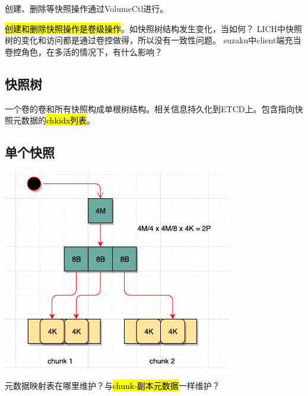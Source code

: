 创建、删除等快照操作通过VolumeCtl进行。

\hl{创建和删除快照操作是卷级操作}。如快照树结构发生变化，当如何？
LICH中快照树的变化和访问都是通过卷控做得，所以没有一致性问题。
suzaku中client端充当卷控角色，在多活的情况下，有什么影响？


\subsection{快照树}

一个卷的卷和所有快照构成单根树结构。相关信息持久化到ETCD上。包含指向快照元数据的\hl{chkidx列表}。



\subsection{单个快照}

\begin{center}
\includegraphics[width=10cm]{../imgs/snapshot-head.png}
\end{center}

元数据映射表在哪里维护？与\hl{chunk-副本元数据}一样维护？


